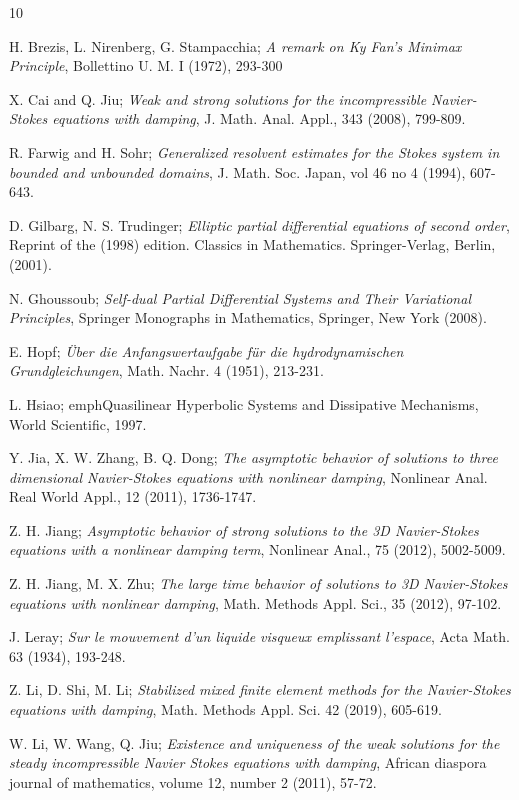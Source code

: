 \documentclass[reqno]{amsart}
\begin{document}
\begin{thebibliography}{10}


H. Brezis, L. Nirenberg, G. Stampacchia;
\emph{A remark on Ky Fan's Minimax Principle},  Bollettino U. M. I
(1972), 293-300

X. Cai and Q. Jiu;
\emph{Weak and strong solutions for the incompressible Navier-Stokes equations
with damping}, J. Math. Anal. Appl., 343 (2008), 799-809.

R. Farwig and H. Sohr;
\emph{Generalized resolvent estimates for the Stokes system in bounded and unbounded
domains}, J. Math. Soc. Japan, vol 46 no 4 (1994), 607-643.

 D. Gilbarg, N. S. Trudinger;
\emph{Elliptic partial differential equations of second order}, Reprint of the (1998)
edition. Classics in Mathematics. Springer-Verlag, Berlin, (2001).

 N. Ghoussoub;
\emph{Self-dual Partial Differential Systems and Their Variational Principles},
Springer Monographs in Mathematics, Springer, New York (2008).

E. Hopf;
\emph{Über die Anfangswertaufgabe für die hydrodynamischen Grundgleichungen},
 Math. Nachr. 4 (1951), 213-231.

L. Hsiao;
emph{Quasilinear Hyperbolic Systems and Dissipative Mechanisms}, World Scientific, 1997.

Y. Jia, X. W. Zhang, B. Q. Dong;
\emph{The asymptotic behavior of solutions to three dimensional Navier-Stokes equations
with nonlinear damping}, Nonlinear Anal. Real World
Appl., 12 (2011), 1736-1747.

Z. H. Jiang;
\emph{Asymptotic behavior of strong solutions to the 3D Navier-Stokes equations with
a nonlinear damping term}, Nonlinear Anal., 75 (2012), 5002-5009.

Z. H. Jiang, M. X. Zhu;
\emph{The large time behavior of solutions to 3D Navier-Stokes equations
with nonlinear damping}, Math. Methods Appl. Sci., 35 (2012), 97-102.


J. Leray;
\emph{Sur le mouvement d'un liquide visqueux emplissant l'espace},
 Acta Math. 63 (1934), 193-248.

Z. Li, D. Shi, M. Li;
\emph{Stabilized mixed finite element methods for the Navier-Stokes equations with
damping}, Math. Methods Appl. Sci. 42 (2019), 605-619.

W. Li, W. Wang, Q. Jiu;
\emph{Existence and uniqueness of the weak solutions for the steady
incompressible Navier Stokes equations with damping}, African diaspora journal of
mathematics, volume 12, number 2 (2011), 57-72.


\end{thebibliography}
\end{document}
